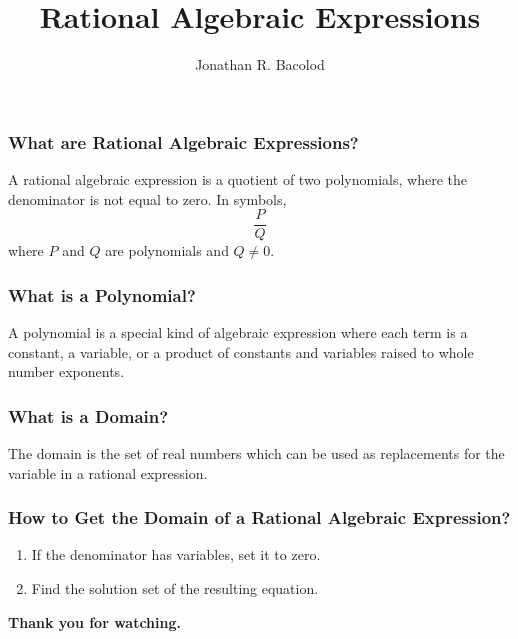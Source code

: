 \documentclass[14pt]{beamer}
\title[] {Rational Algebraic Expressions}
\author{Jonathan R. Bacolod}
\institute[SHS]{Sauyo High School}
\date{}
\begin{document}
	\frame{\titlepage}
	
	\begin{frame}
		\frametitle{What are Rational Algebraic Expressions?}
		A rational algebraic expression is a quotient of two polynomials, where the denominator is not equal to zero.
		In symbols, $$\displaystyle \frac{P}{Q}$$ where $P$ and $Q$ are polynomials and $Q \neq 0$.  
	\end{frame}

    \begin{frame}
    	\frametitle{What is a Polynomial?}
    	 A polynomial is a special kind of algebraic
    	 expression where each term is a constant,
    	 a variable, or a product of constants and
    	 variables raised to whole number exponents.
    \end{frame}
	
	\begin{frame}
		\frametitle{What is a Domain?}
		The domain is the set of real numbers which can be used as replacements for the variable in a rational expression. 
	\end{frame}

    \begin{frame}
    	\frametitle{How to Get the Domain of a Rational Algebraic Expression?}
    	
    	\begin{enumerate}
    		\item<1-> If the denominator has variables, set it to zero.
    		\item<2-> Find the solution set of the resulting equation.
       	\end{enumerate}
    \end{frame}
	
    \begin{frame}
    	\begin{center}
    		\textbf{\LARGE Thank you for watching.}
    	\end{center}
    \end{frame}
	
\end{document}
